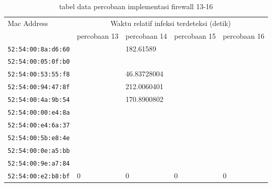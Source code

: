 \begin{table}[H]
	\caption{tabel data percobaan implementasi firewall 13-16}
	\label{table:data percobaan implementasi firewall 13_16}
	\centering
	\footnotesize
	\begin{tabular}{|l|l|l|l|l|}
		\hline
		\multirow{2}{*}{Mac Address} & \multicolumn{4}{c|}{Waktu relatif infeksi terdeteksi (detik)} \\ \cline{2-5} 
		& percobaan 13 & percobaan 14 & percobaan 15 & percobaan 16\\ \hline
		\verb|52:54:00:8a:d6:60| &  & 182.61589 &  & \\ \hline
		\verb|52:54:00:05:0f:b0| &  &  &  & \\ \hline
		\verb|52:54:00:53:55:f8| &  & 46.83728004 &  & \\ \hline
		\verb|52:54:00:94:47:8f| &  & 212.0060401 &  & \\ \hline
		\verb|52:54:00:4a:9b:54| &  & 170.8900802 &  & \\ \hline
		\verb|52:54:00:00:e4:8a| &  &  &  & \\ \hline
		\verb|52:54:00:e4:6a:37| &  &  &  & \\ \hline
		\verb|52:54:00:5b:e8:4e| &  &  &  & \\ \hline
		\verb|52:54:00:0e:a5:bb| &  &  &  & \\ \hline
		\verb|52:54:00:9e:a7:84| &  &  &  & \\ \hline
		\verb|52:54:00:e2:b8:bf| & 0 & 0 & 0 & 0\\ \hline
	\end{tabular}
\end{table}